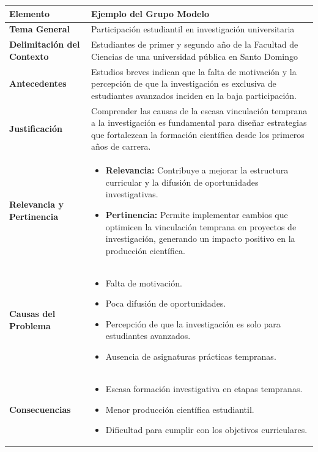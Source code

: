 \documentclass[12pt,a4paper]{article}
\begin{document}
\begin{tabular}{@{}p{5cm}p{10cm}@{}}
\toprule
\textbf{Elemento} & \textbf{Ejemplo del Grupo Modelo} \\ \midrule
\textbf{Tema General} & Participación estudiantil en investigación universitaria \\[1mm]
\textbf{Delimitación del Contexto} & Estudiantes de primer y segundo año de la Facultad de Ciencias de una universidad pública en Santo Domingo \\[1mm]
\textbf{Antecedentes} & Estudios breves indican que la falta de motivación y la percepción de que la investigación es exclusiva de estudiantes avanzados inciden en la baja participación. \\[1mm]
\textbf{Justificación} & Comprender las causas de la escasa vinculación temprana a la investigación es fundamental para diseñar estrategias que fortalezcan la formación científica desde los primeros años de carrera. \\[1mm]
\textbf{Relevancia y Pertinencia} & \begin{itemize}[noitemsep]
    \item \textbf{Relevancia:} Contribuye a mejorar la estructura curricular y la difusión de oportunidades investigativas.
    \item \textbf{Pertinencia:} Permite implementar cambios que optimicen la vinculación temprana en proyectos de investigación, generando un impacto positivo en la producción científica.
\end{itemize} \\[1mm]
\textbf{Causas del Problema} & \begin{itemize}[noitemsep]
    \item Falta de motivación.
    \item Poca difusión de oportunidades.
    \item Percepción de que la investigación es solo para estudiantes avanzados.
    \item Ausencia de asignaturas prácticas tempranas.
\end{itemize} \\[1mm]
\textbf{Consecuencias} & \begin{itemize}[noitemsep]
    \item Escasa formación investigativa en etapas tempranas.
    \item Menor producción científica estudiantil.
    \item Dificultad para cumplir con los objetivos curriculares.
\end{itemize} \\[1mm]

\end{tabular}
\end{document}

